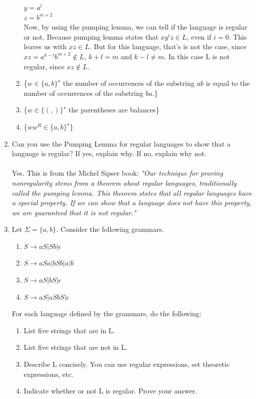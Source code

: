 \documentclass{article}
\begin{document}
\begin{enumerate}
\begin{enumerate}[label=(\alph*)]
			$y = a^l$\\
			$z = b^{m+2}$\\
			Now, by using the pumping lemma, we can tell if the language is regular or not. Because pumping lemma states that $xy^iz \in L$, even if $i=0$. This leaves us with $xz \in L$. But for this language, that's is not the case, since $xz = a^{k-l}b^{m+2} \notin L$, $k + l = m$ and $k - l \neq m$. In this case L is not regular, since $xz \notin L$.
			\item \{$w \in \{ a,b \}^{\star}$ the number of occurrences of the substring $ab$ is equal to the number of occurrences of the substring $ba$.\}
			\item \{$w \in \{(,)\}^{\star}$  the parentheses are balances\}
			\item \{$ww^R \in \{a,b\}^\star$\}
		\end{enumerate}
		\item Can you use the Pumping Lemma for regular languages to show that a language is regular? If yes, explain why. If no, explain why not. \\~\\
		Yes. This is from the Michel Sipser book: \textit{"Our technique for proving nonregularity stems from a theorem about regular
		languages, traditionally called the pumping lemma. This theorem states that all
		regular languages have a special property. If we can show that a language does
		not have this property, we are guaranteed that it is not regular."}
		\item Let $\Sigma = \{a,b\}$. Consider the following grammars.
		 \begin{enumerate}[label=(\alph*)]
		 	\item $S \rightarrow aS|Sb|\epsilon$
		 	\item $S \rightarrow aSa|bSb|a|b$
		 	\item $S \rightarrow aS|bS|\epsilon$
		 	\item $S \rightarrow aS|aSbS|\epsilon$
		 \end{enumerate}
	For each language defined by the grammars, do the following:
		\begin{enumerate}[label=(\alph*)]
			\item  List five strings that are in L.
			\item  List five strings that are not in L.
			\item Describe L concisely. You can use regular expressions, set theoretic expressions, etc.
			\item  Indicate whether or not L is regular. Prove your answer.

\end{enumerate}
\end{enumerate}
\end{document}

